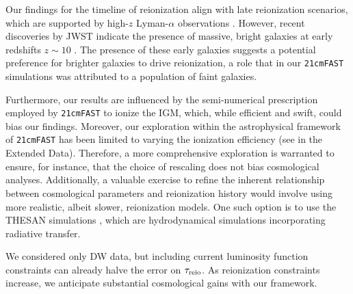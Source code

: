 Our findings for the timeline of reionization align with late
reionization scenarios, which are supported by high-$z$ Lyman-$\alpha$
observations \cite{Keating2020, Cain2021}.
However, recent discoveries by JWST indicate the presence of massive,
bright galaxies at early redshifts $z \sim 10$
\cite{Adams2023, Bradley2023, Donnan2023}.
The presence of these early galaxies suggests a potential preference for
brighter galaxies to drive reionization, a role that in our
\texttt{21cmFAST} simulations was attributed to a population of faint
galaxies.

Furthermore, our results are influenced by the semi-numerical
prescription employed by \texttt{21cmFAST} to ionize the IGM, which,
while efficient and swift, could bias our findings.
Moreover, our exploration within the astrophysical framework of
\texttt{21cmFAST} has been limited to varying the ionization efficiency
(see  in the Extended Data).
Therefore, a more comprehensive exploration is warranted to ensure, for
instance, that the choice of rescaling does not bias cosmological 
analyses. Additionally, a valuable exercise to refine the inherent relationship
between cosmological parameters and reionization history would involve
using more realistic, albeit slower, reionization models.
One such option is to use the THESAN simulations \cite{Kannan2022},
which are hydrodynamical simulations incorporating radiative transfer.

We considered only DW data, but including current luminosity function 
constraints can already halve the error on $\tau_{\mathrm{reio}}$. As reionization 
constraints increase, we anticipate substantial cosmological gains with
our framework.
